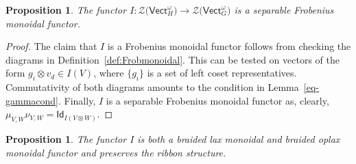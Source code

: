 \documentclass[10pt,a4paper]{amsart}
\numberwithin{equation}{section}
\newtheorem{Proposition}[Theorem]{Proposition}
 { \theoremstyle{definition}
\newtheorem{Definition}[Theorem]{Definition}
\newtheorem{Note}[Theorem]{Note}
\newtheorem{Notation}[Theorem]{Notation}
\newtheorem{Example}[Theorem]{Example}
\newtheorem{Remark}[Theorem]{Remark} }
\newcommand{\ide}{\mathsf{Id}}
\newcommand{\Vect}{\mathsf{Vect}}
\newcommand{\cZ}{\mathcal{Z}}
\newcommand{\rI}{I}
\begin{document}
\begin{Proposition}\label{prop:Frob}
The functor $\rI\colon \cZ\big(\Vect_H^\omega\big)\to \cZ\big(\Vect_G^\omega\big)$ is a separable Frobenius monoidal functor.
\end{Proposition}
\begin{proof}
The claim that $\rI$ is a Frobenius monoidal functor follows from checking the diagrams in Definition~\ref{def:Frobmonoidal}. This can be tested on vectors of the form $g_i\otimes v_d\in \rI(V)$, where $\{g_i\}$ is a set of left coset representatives. Commutativity of both diagrams amounts to the condition in Lemma~\ref{eq-gammacond}. Finally, $\rI$ is a separable Frobenius monoidal functor as, clearly, $\mu_{V,W}\nu_{V,W}=\ide_{\rI(V\otimes W)}$.
\end{proof}

\begin{Proposition}\label{prop:braidedFrob}
The functor $I$ is both a braided lax monoidal and braided oplax monoidal functor and preserves the ribbon structure.
\end{Proposition}
\end{document}
